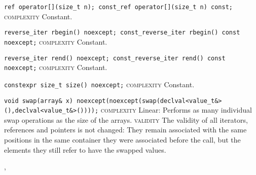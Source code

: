 \noindent{}\hspace*{0.25em}\lstinline[basicstyle=\ttfamily\color{cgreen}]{ref operator[](size_t n); const_ref operator[](size_t n) const;} \textsc{complexity} Constant.\\\vspace{-0.6em}

\noindent{}\hspace*{0.25em}\lstinline[basicstyle=\ttfamily\color{cgreen}]{reverse_iter rbegin() noexcept; const_reverse_iter rbegin() const noexcept;} \textsc{complexity} Constant.\\\vspace{-0.6em}

\noindent{}\hspace*{0.25em}\lstinline[basicstyle=\ttfamily\color{cgreen}]{reverse_iter rend() noexcept; const_reverse_iter rend() const noexcept;} \textsc{complexity} Constant.\\\vspace{-0.6em}

\noindent{}\hspace*{0.25em}\lstinline[basicstyle=\ttfamily\color{cgreen}]{constexpr size_t size() noexcept;} \textsc{complexity} Constant.\\\vspace{-0.6em}

\noindent{}\hspace*{0.25em}\lstinline[basicstyle=\ttfamily\color{corange}]{void swap(array& x) noexcept(noexcept(swap(declval<value_t&>(),declval<value_t&>())));} \textsc{complexity} Linear: Performs as many individual swap operations as the size of the arrays. \textsc{validity} The validity of all iterators, references and pointers is not changed: They remain associated with the same positions in the same container they were associated before the call, but the elements they still refer to have the swapped values.\\\vspace{-0.6em}


\sep
{}
